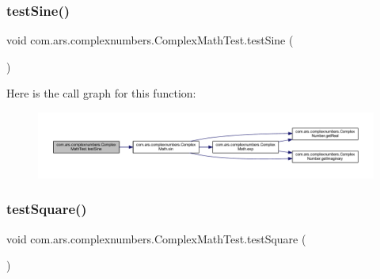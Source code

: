 \subsubsection{\texorpdfstring{test\+Sine()}{testSine()}}
{\footnotesize\ttfamily void com.\+ars.\+complexnumbers.\+Complex\+Math\+Test.\+test\+Sine (\begin{DoxyParamCaption}{ }\end{DoxyParamCaption})}

Here is the call graph for this function\+:\nopagebreak
\begin{figure}[H]
\begin{center}
\leavevmode
\includegraphics[width=350pt]{classcom_1_1ars_1_1complexnumbers_1_1_complex_math_test_ab429903cc819ea2c83369e07ba2f49e9_cgraph}
\end{center}
\end{figure}
\hypertarget{classcom_1_1ars_1_1complexnumbers_1_1_complex_math_test_a43dc686fe2b96e097f3ee8095fef12c1}{}\label{classcom_1_1ars_1_1complexnumbers_1_1_complex_math_test_a43dc686fe2b96e097f3ee8095fef12c1} 
\subsubsection{\texorpdfstring{test\+Square()}{testSquare()}}
{\footnotesize\ttfamily void com.\+ars.\+complexnumbers.\+Complex\+Math\+Test.\+test\+Square (\begin{DoxyParamCaption}{ }\end{DoxyParamCaption})}

